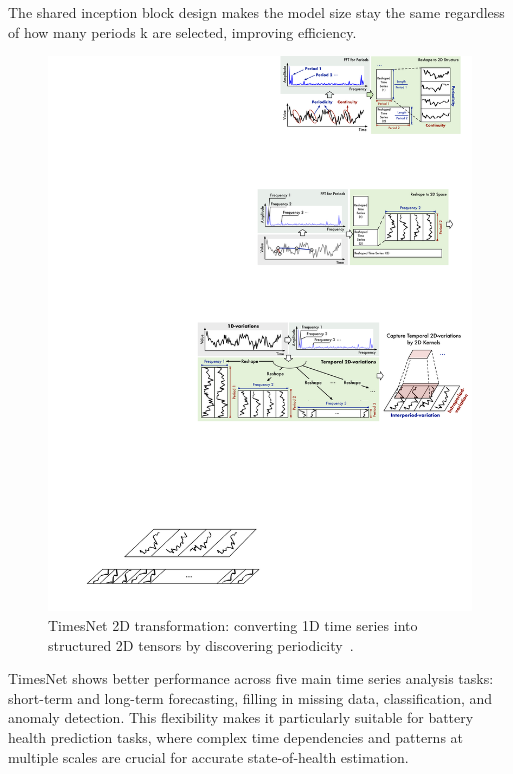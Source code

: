 The shared inception block design makes the model size stay the same regardless of how many periods k are selected, improving efficiency.

\begin{figure}[htbp]
    \centering
    \includegraphics[width=1.0\textwidth]{imgs/timesnet_2d_structure.pdf}
    \caption{TimesNet 2D transformation: converting 1D time series into structured 2D tensors by discovering periodicity~\cite{wu_timesnet_2023}.}
    \label{fig:timesnet_2d_transformation}
\end{figure}

TimesNet shows better performance across five main time series analysis tasks: short-term and long-term forecasting, filling in missing data, classification, and anomaly detection. This flexibility makes it particularly suitable for battery health prediction tasks, where complex time dependencies and patterns at multiple scales are crucial for accurate state-of-health estimation. 

